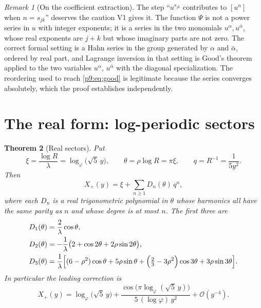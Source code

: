 \documentclass[11pt,a4paper,oneside]{book}
\theoremstyle{plain}
\newtheorem{theorem}{Theorem}[chapter]
\theoremstyle{definition}
\theoremstyle{remark}
\newtheorem{remark}[theorem]{Remark}
\newcommand{\Coef}[1]{[#1]\,}
\newcommand{\bigO}{\mathcal{O}}
\begin{document}
\begin{remark}[On the coefficient extraction]\label{p9:rem:good-care}
The step ``$u^{s_{jk}}$ contributes to $\Coef{u^{n}}$ when $n=s_{jk}$''
deserves the caution V1 gives it.  The function $\Psi$ is not a power series
in $u$ with integer exponents; it is a series in the two monomials
$u^{\alpha},u^{\bar\alpha}$, whose real exponents are $j+k$ but whose
imaginary parts are not zero.  The correct formal setting is a Hahn series in
the group generated by $\alpha$ and $\bar\alpha$, ordered by real part, and
Lagrange inversion in that setting is Good's theorem applied to the two
variables $u^{\alpha}$, $u^{\bar\alpha}$ with the diagonal specialization.
The reordering used to reach \eqref{p9:eq:good} is legitimate because the
series converges absolutely, which the proof establishes independently.
\end{remark}

\section{The real form: log-periodic sectors}
\label{p9:sec:real}

\begin{theorem}[Real sectors]\label{p9:thm:real-sectors}
Put
\begin{equation}\label{p9:eq:xi-theta}
 \xi=\frac{\log R}\lambda=\log_\varphi\bigl(\sqrt5\,y\bigr),
 \qquad
 \theta=\rho\log R=\pi\xi,
 \qquad
 q=R^{-1}=\frac1{5y^{2}} .
\end{equation}
Then
\begin{equation}\label{p9:eq:real-form}
 X_+(y)=\xi+\sum_{n\ge1}D_n(\theta)\,q^{n},
\end{equation}
where each $D_n$ is a real trigonometric polynomial in $\theta$ whose
harmonics all have the same parity as $n$ and whose degree is at most $n$.
The first three are
\begin{align}
 D_1(\theta)&=\frac2\lambda\cos\theta,
 \label{p9:eq:D1}\\
 D_2(\theta)&=-\frac1\lambda\bigl(2+\cos2\theta+2\rho\sin2\theta\bigr),
 \label{p9:eq:D2}\\
 D_3(\theta)&=\frac1\lambda\Bigl[(6-\rho^{2})\cos\theta+5\rho\sin\theta
 +\Bigl(\tfrac23-3\rho^{2}\Bigr)\cos3\theta+3\rho\sin3\theta\Bigr].
 \label{p9:eq:D3}
\end{align}
In particular the leading correction is
\begin{equation}\label{p9:eq:leading}
 X_+(y)=\log_\varphi\bigl(\sqrt5\,y\bigr)
 +\frac{\cos\bigl(\pi\log_\varphi(\sqrt5\,y)\bigr)}{5\,(\log\varphi)\,y^{2}}
 +\bigO(y^{-4}).
\end{equation}
\end{theorem}
\end{document}
